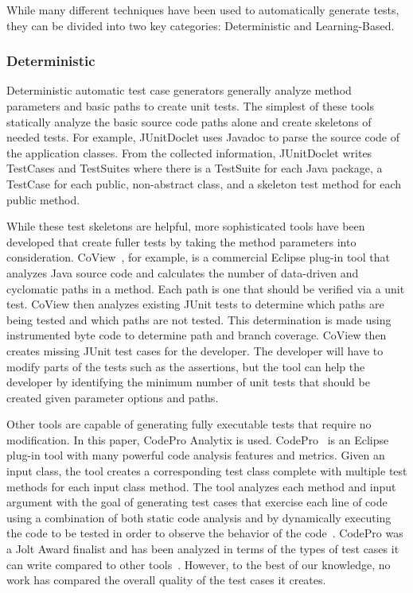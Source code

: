 While many different techniques have been used to automatically generate tests, they can be divided into two key categories: Deterministic and Learning-Based.

\subsubsection{Deterministic}
Deterministic automatic test case generators generally analyze method parameters and basic paths to create unit tests.  The simplest of these tools statically analyze the basic source code paths alone and create skeletons of  needed tests.  For example, JUnitDoclet \cite{JUnitDoclet} uses Javadoc to parse the source code of the application classes. From the collected information, JUnitDoclet writes TestCases and TestSuites where there is a TestSuite for each Java package, a TestCase for each public, non-abstract class, and a skeleton test method for each public method. %

While these test skeletons are helpful, more sophisticated tools have been developed that create fuller tests by taking the method parameters into consideration. CoView~\cite{CoView}, for example, is a commercial Eclipse plug-in tool that analyzes Java source code and calculates the number of data-driven and cyclomatic paths in a method. Each path is one that should be verified via a unit test. CoView then analyzes existing JUnit tests to determine which paths are being tested and which paths are not tested. This determination is made using instrumented byte code to determine path and branch coverage. CoView then creates missing JUnit test cases for the developer. The developer will have to modify parts of the tests such as the assertions, but the tool can help the developer by identifying the minimum number of unit tests that should be created given parameter options and paths.

Other tools are capable of generating fully executable tests that require no modification.  In this paper, CodePro Analytix is used.  CodePro~\cite{CodePro1} is an Eclipse plug-in tool with many powerful code analysis features and metrics.  Given an input class, the tool creates a corresponding test class complete with multiple test methods for each input class method. The tool analyzes each method and input argument with the goal of generating test cases that exercise each line of code using a combination of both static code analysis and by dynamically executing the code to be tested in order to observe the behavior of the code~\cite{CodePro2}.  CodePro was a Jolt Award finalist and has been analyzed in terms of the types of test cases it can write compared to other tools~\cite{xie2009}.  However, to the best of our knowledge, no work has compared the overall quality of the test cases it creates.


